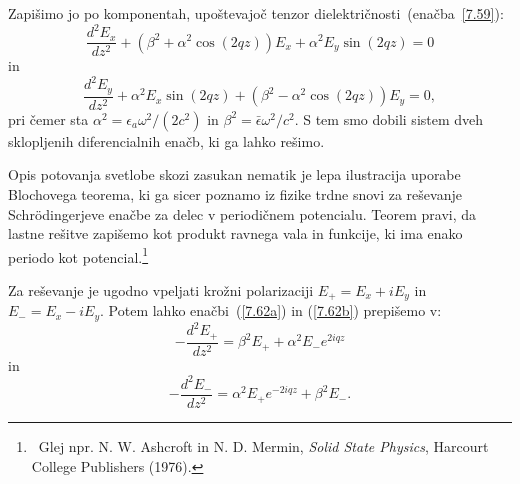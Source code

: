 Zapišimo jo po komponentah, upoštevajoč tenzor dielektričnosti~(enačba~\ref{7.59}):
\begin{equation}
\frac{d^{2}E_{x}}{dz^{2}} + 
(\beta^{2}+\alpha^{2}\cos(2qz))E_{x}+\alpha^{2}E_{y}\sin(2qz) = 0
\label{7.62a}
\end{equation}
in 
\begin{equation}
\frac{d^{2}E_{y}}{dz^{2}} +
\alpha^{2}E_{x}\sin(2qz)+(\beta^{2}-\alpha^{2}\cos(2qz))E_{y} = 0,
\label{7.62b}
\end{equation}
pri čemer sta $\alpha^{2}=\epsilon_{a}\omega^{2}/(2c^{2})$ in 
$\beta^{2}=\bar{\epsilon}\omega^{2}/c^{2}$. S tem smo dobili sistem
dveh sklopljenih diferencialnih enačb, ki ga lahko rešimo.
\begin{remark}
Opis potovanja svetlobe skozi zasukan nematik je lepa ilustracija uporabe 
Blochovega teorema, ki ga sicer poznamo iz fizike trdne snovi za 
reševanje Schr\"odingerjeve enačbe za delec v periodičnem potencialu. Teorem pravi, 
da lastne rešitve zapišemo kot produkt ravnega vala in funkcije, ki ima enako 
periodo kot potencial.\footnote{~Glej npr. N. W. Ashcroft in 
N. D. Mermin, {\it Solid State Physics}, Harcourt College
Publishers (1976).}
\end{remark}

Za reševanje je ugodno vpeljati krožni polarizaciji 
$E_{+}=E_{x}+iE_{y}$ in $E_{-}=E_{x}-iE_{y}$. Potem lahko 
enačbi~(\ref{7.62a}) in (\ref{7.62b}) prepišemo v:
\begin{equation}
-\frac{d^{2}E_{+}}{dz^{2}}=\beta^{2}E_{+}+\alpha^{2}E_{-}e^{2iqz}
\label{lcm1}
\end{equation}
in 
\begin{equation}
-\frac{d^{2}E_{-}}{dz^{2}}=\alpha^{2}E_{+}e^{-2iqz}+\beta^{2}E_{-}.
\label{lcm2}
\end{equation}

